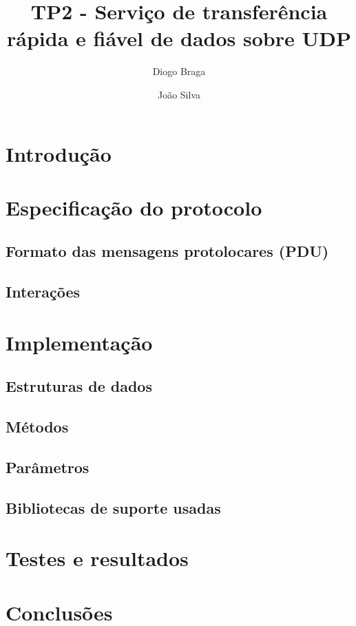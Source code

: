 \documentclass{llncs}
\begin{document}
\mainmatter
\title{TP2 - Serviço de transferência rápida e fiável de dados sobre UDP}


\author{Diogo Braga \and João Silva}



\date{}


\maketitle

\section{Introdução}



\section{Especificação do protocolo}

\subsection{Formato das mensagens protolocares (PDU)}

\subsection{Interações}



\section{Implementação}

\subsection{Estruturas de dados}

\subsection{Métodos}

\subsection{Parâmetros}

\subsection{Bibliotecas de suporte usadas}



\section{Testes e resultados}



\section{Conclusões}
\end{document}
